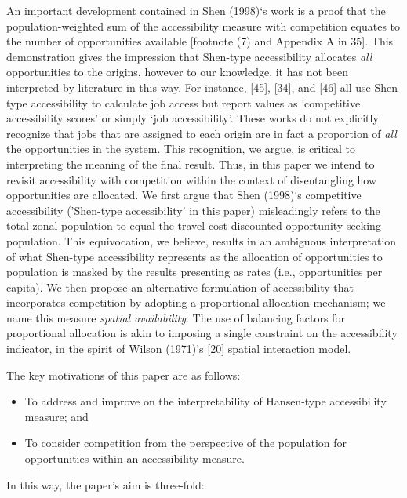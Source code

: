 \documentclass[10pt,letterpaper]{article}
\begin{document}
An important development contained in Shen (1998)`s work is a proof that
the population-weighted sum of the accessibility measure with
competition equates to the number of opportunities available {[}footnote
(7) and Appendix A in 35{]}. This demonstration gives the impression
that Shen-type accessibility allocates \emph{all} opportunities to the
origins, however to our knowledge, it has not been interpreted by
literature in this way. For instance, {[}45{]}, {[}34{]}, and {[}46{]}
all use Shen-type accessibility to calculate job access but report
values as 'competitive accessibility scores' or simply `job
accessibility'. These works do not explicitly recognize that jobs that
are assigned to each origin are in fact a proportion of \emph{all} the
opportunities in the system. This recognition, we argue, is critical to
interpreting the meaning of the final result. Thus, in this paper we
intend to revisit accessibility with competition within the context of
disentangling how opportunities are allocated. We first argue that Shen
(1998)`s competitive accessibility ('Shen-type accessibility' in this
paper) misleadingly refers to the total zonal population to equal the
travel-cost discounted opportunity-seeking population. This
equivocation, we believe, results in an ambiguous interpretation of what
Shen-type accessibility represents as the allocation of opportunities to
population is masked by the results presenting as rates (i.e.,
opportunities per capita). We then propose an alternative formulation of
accessibility that incorporates competition by adopting a proportional
allocation mechanism; we name this measure \emph{spatial availability}.
The use of balancing factors for proportional allocation is akin to
imposing a single constraint on the accessibility indicator, in the
spirit of Wilson (1971)'s {[}20{]} spatial interaction model.

The key motivations of this paper are as follows:

\begin{itemize}
\item
  To address and improve on the interpretability of Hansen-type
  accessibility measure; and
\item
  To consider competition from the perspective of the population for
  opportunities within an accessibility measure.
\end{itemize}

In this way, the paper's aim is three-fold:
\end{document}
